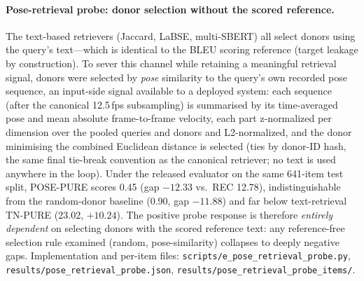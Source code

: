 \documentclass[pdflatex,sn-chicago]{sn-jnl}
\begin{document}
\paragraph{Pose-retrieval probe: donor selection without the scored reference.}
The text-based retrievers (Jaccard, LaBSE, multi-SBERT) all select donors using the query's text---which is identical to the BLEU scoring reference (target leakage by construction). To sever this channel while retaining a meaningful retrieval signal, donors were selected by \emph{pose} similarity to the query's own recorded pose sequence, an input-side signal available to a deployed system: each sequence (after the canonical 12.5\,fps subsampling) is summarised by its time-averaged pose and mean absolute frame-to-frame velocity, each part z-normalized per dimension over the pooled queries and donors and L2-normalized, and the donor minimising the combined Euclidean distance is selected (ties by donor-ID hash, the same final tie-break convention as the canonical retriever; no text is used anywhere in the loop). Under the released evaluator on the same 641-item test split, POSE-PURE scores 0.45 (gap $-12.33$ vs.\ REC 12.78), indistinguishable from the random-donor baseline (0.90, gap $-11.88$) and far below text-retrieval TN-PURE (23.02, $+10.24$). The positive probe response is therefore \emph{entirely dependent} on selecting donors with the scored reference text: any reference-free selection rule examined (random, pose-similarity) collapses to deeply negative gaps. Implementation and per-item files: \texttt{scripts/e\_pose\_retrieval\_probe.py}, \texttt{results/pose\_retrieval\_probe.json}, \texttt{results/pose\_retrieval\_probe\_items/}.
\end{document}
